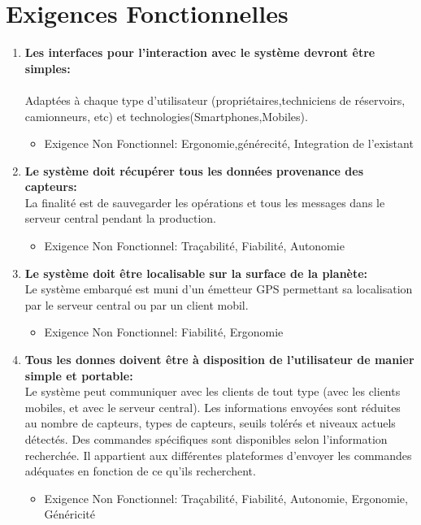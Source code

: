 \documentclass [a4paper] {report}
\begin{document}
\section{Exigences Fonctionnelles}
\begin{enumerate}



\item  \textbf{Les interfaces pour l'interaction avec le système devront être simples:}\\\\
Adaptées à chaque type d'utilisateur (propriétaires,techniciens de réservoirs, camionneurs, etc) et technologies(Smartphones,Mobiles).
\begin{itemize}
\item Exigence Non Fonctionnel: Ergonomie,générecité, Integration de l'existant\\
\end{itemize}

\item  \textbf{Le système doit récupérer tous les données provenance des capteurs:}\\
La finalité est de sauvegarder les opérations et tous les messages dans le serveur central pendant la production.
\begin{itemize}
\item Exigence Non Fonctionnel: Traçabilité, Fiabilité, Autonomie\\
\end{itemize}

\item  \textbf{Le système doit être localisable sur la surface de la planète:}\\
Le système embarqué est muni d'un émetteur GPS permettant sa localisation par le serveur central ou par un client mobil.
\begin{itemize}
\item Exigence Non Fonctionnel: Fiabilité, Ergonomie\\
\end{itemize}

\item  \textbf{Tous les donnes doivent être à disposition de l'utilisateur de manier simple et portable:}\\
Le système peut communiquer avec les clients de tout type (avec les clients mobiles, et avec le serveur central). Les informations envoyées sont réduites au nombre de capteurs, types de capteurs, seuils tolérés et niveaux actuels détectés. Des commandes spécifiques sont disponibles selon l'information recherchée. Il appartient aux différentes plateformes d'envoyer les commandes adéquates en fonction de ce qu'ils recherchent.
\begin{itemize}
\item Exigence Non Fonctionnel: Traçabilité, Fiabilité, Autonomie, Ergonomie, Généricité\\
\end{itemize}


\end{enumerate}
\end{document}
